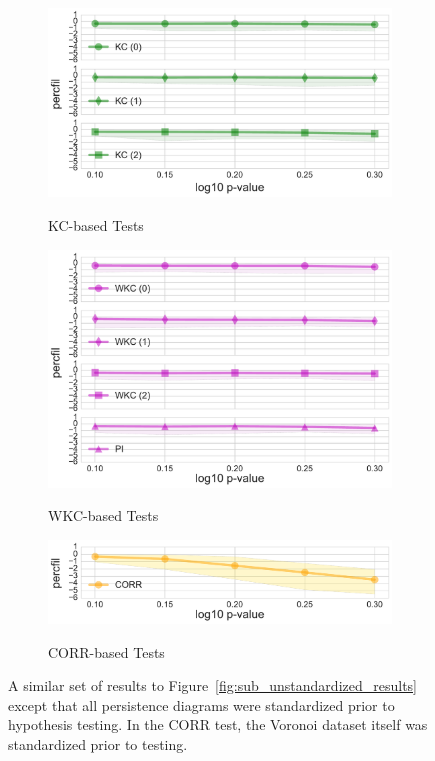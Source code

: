 \documentclass[12pt]{article}
\newcommand{\figref}[1]{Figure~\ref{#1}}
\begin{document}
\begin{center}
\begin{figure}[htp!]
\begin{subfigure}{.45\textwidth}
      \label{fig:sub_silh}
    \end{subfigure}
    \begin{subfigure}{.45\textwidth}
      \centering
      \caption{KC-based Tests}
      \includegraphics[width=\linewidth]{sub_contour_lineplot_log10_norm_True.pdf}
      \label{fig:sub_contour}
    \end{subfigure}
    \begin{subfigure}{.45\textwidth}
      \centering
      \caption{WKC-based Tests}
      \includegraphics[width=\linewidth]{sub_weight_lineplot_log10_norm_True.pdf}
      \label{fig:sub_weight}
    \end{subfigure}
    \begin{subfigure}{.45\textwidth}
      \caption{CORR-based Tests}
      \includegraphics[width=\linewidth]{sub_corr_lineplot_log10_norm_True.pdf}
      \label{fig:sub_corr}
    \end{subfigure}
  \caption{A similar set of results to \figref{fig:sub_unstandardized_results} except that all persistence diagrams were standardized prior to hypothesis testing. In the CORR test, the Voronoi dataset itself was standardized prior to testing.}
  \label{fig:sub_standardized_results}
  \end{figure}
\end{center}
\end{document}
